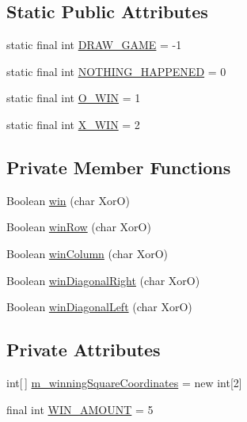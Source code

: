 \subsection*{Static Public Attributes}
\begin{DoxyCompactItemize}
\item 
static final int \hyperlink{class_board_1_1_board_t_t_t_a16be9cbe57d43388a3fa6e5b706210e5}{D\+R\+A\+W\+\_\+\+G\+A\+M\+E} = -\/1
\item 
static final int \hyperlink{class_board_1_1_board_t_t_t_a5448324216e6a32d3264e50779962562}{N\+O\+T\+H\+I\+N\+G\+\_\+\+H\+A\+P\+P\+E\+N\+E\+D} = 0
\item 
static final int \hyperlink{class_board_1_1_board_t_t_t_a989aacd76a6193fe54a4500dd8151b41}{O\+\_\+\+W\+I\+N} = 1
\item 
static final int \hyperlink{class_board_1_1_board_t_t_t_ab77ee706643fb1825e78f6b8dcacc021}{X\+\_\+\+W\+I\+N} = 2
\end{DoxyCompactItemize}
\subsection*{Private Member Functions}
\begin{DoxyCompactItemize}
\item 
Boolean \hyperlink{class_board_1_1_board_t_t_t_ab7d0a91870f300ee5544da2c1ee8b67c}{win} (char Xor\+O)
\item 
Boolean \hyperlink{class_board_1_1_board_t_t_t_adeda4fd9adb536be218a068d71be8587}{win\+Row} (char Xor\+O)
\item 
Boolean \hyperlink{class_board_1_1_board_t_t_t_aa133bbee4e44152b8ba57191475409ab}{win\+Column} (char Xor\+O)
\item 
Boolean \hyperlink{class_board_1_1_board_t_t_t_a756f492a748b6050441c6f821809c40d}{win\+Diagonal\+Right} (char Xor\+O)
\item 
Boolean \hyperlink{class_board_1_1_board_t_t_t_a5f5114b28a09db036e030ec6bb97f189}{win\+Diagonal\+Left} (char Xor\+O)
\end{DoxyCompactItemize}
\subsection*{Private Attributes}
\begin{DoxyCompactItemize}
\item 
int\mbox{[}$\,$\mbox{]} \hyperlink{class_board_1_1_board_t_t_t_a50bc789f0168c29495d4827cca10c89f}{m\+\_\+winning\+Square\+Coordinates} = new int\mbox{[}2\mbox{]}
\item 
final int \hyperlink{class_board_1_1_board_t_t_t_ab11d997e2ea0983b566f23c4685767f6}{W\+I\+N\+\_\+\+A\+M\+O\+U\+N\+T} = 5
\end{DoxyCompactItemize}

